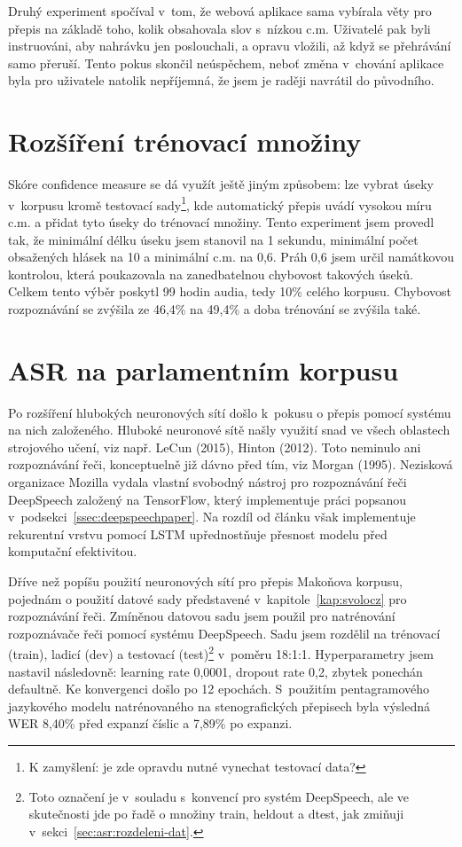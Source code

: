 Druhý experiment spočíval v~tom, že webová aplikace sama vybírala věty pro
přepis na základě toho, kolik obsahovala slov s~nízkou c.m. Uživatelé pak byli
instruováni, aby nahrávku jen poslouchali, a opravu vložili, až když se
přehrávání samo přeruší. Tento pokus skončil neúspěchem, neboť
změna v~chování aplikace byla pro uživatele natolik nepříjemná, že jsem je
raději navrátil do původního.

\section{Rozšíření trénovací množiny}
\label{sec:confident}

Skóre confidence measure se dá využít ještě jiným způsobem: lze vybrat
úseky v~korpusu kromě testovací sady\footnote{K zamyšlení: je zde opravdu nutné
vynechat testovací data?}, kde automatický přepis uvádí vysokou míru
c.m. a přidat tyto úseky do trénovací množiny. Tento experiment jsem provedl
tak, že minimální délku úseku jsem stanovil na 1 sekundu, minimální počet
obsažených hlásek na 10 a minimální c.m. na 0,6. Práh 0,6 jsem určil namátkovou
kontrolou, která poukazovala na zanedbatelnou chybovost takových úseků. Celkem
tento výběr poskytl 99 hodin audia, tedy 10\% celého korpusu.
Chybovost rozpoznávání se zvýšila ze 46,4\% na 49,4\% a doba trénování
se zvýšila také.

\section{ASR na parlamentním korpusu}
\label{sec:csasr:results}

Po rozšíření hlubokých neuronových sítí došlo k~pokusu o přepis pomocí systému
na nich založeného. 
Hluboké neuronové sítě našly využití
snad ve všech oblastech strojového učení, viz např. LeCun
(2015)\cite{lecun2015deep}, Hinton (2012)\cite{hinton2012deep}. Toto neminulo ani
rozpoznávání řeči, konceptuelně již dávno před tím, viz Morgan
(1995)\cite{morgan1995neural}.
Nezisková organizace Mozilla vydala vlastní svobodný nástroj pro rozpoznávání
řeči DeepSpeech\cite{hannun2014deep} založený na
TensorFlow\cite{abadi2016tensorflow}, který implementuje práci popsanou
v~podsekci~\ref{ssec:deepspeechpaper}.
Na rozdíl od článku\cite{hannun2014deep} však implementuje rekurentní vrstvu
pomocí LSTM upřednostňuje přesnost modelu před komputační efektivitou.

Dříve než popíšu použití neuronových sítí pro přepis Makoňova korpusu,  pojednám
o použití datové sady představené v~kapitole~\ref{kap:svolocz} pro rozpoznávání
řeči.
Zmíněnou datovou sadu jsem použil pro natrénování rozpoznávače řeči pomocí
systému DeepSpeech. Sadu jsem
rozdělil na trénovací (train), ladicí (dev) a testovací (test)\footnote{Toto
označení je v~souladu s~konvencí pro systém DeepSpeech, ale ve skutečnosti jde
po řadě o množiny train, heldout a dtest, jak zmiňuji v~sekci~\ref{sec:asr:rozdeleni-dat}.} v~poměru 18:1:1.
Hyperparametry jsem nastavil následovně: learning rate 0,0001, dropout rate 0,2,
zbytek ponechán defaultně. Ke konvergenci došlo po 12 epochách.
S~použitím pentagramového jazykového modelu natrénovaného na
stenografických přepisech byla výsledná WER 8,40\% před expanzí číslic a 7,89\% po expanzi.

